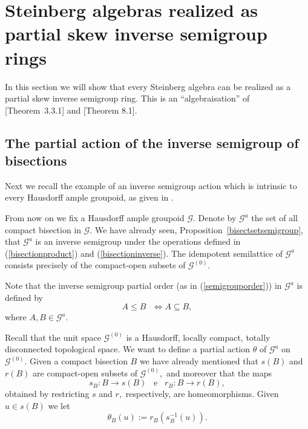 \documentclass[11pt, a4paper]{amsart}
\newcommand{\G}{\ensuremath {\mathcal{G}}}
\newcommand{\Go}{\ensuremath {\mathcal{G}^{(0)}}}
\newcommand{\Ga}{\ensuremath {\mathcal{G}^{a}}}
\theoremstyle{plain}
\begin{document}
\section{Steinberg algebras realized as partial skew inverse semigroup rings }


In this section we will show that every Steinberg algebra can be realized as a partial skew inverse semigroup ring. This is an “algebraisation” of [Theorem~3.3.1]\cite{Paterson} and [Theorem 8.1]\cite{Quigg}.


\subsection*{The partial action of the inverse semigroup of bisections}\label{PAISGBi}

Next we recall the example of an inverse semigroup action which is intrinsic to every Hausdorff ample groupoid, as given in \cite{Exel}. 

From now on we fix a Hausdorff ample groupoid $\G$. Denote by $\Ga$ the set of all compact bisection in $\G.$ We have already seen, Proposition~\ref{bisectsetsemigroup}, that $\Ga$ is an inverse semigroup under the operations defined in (\ref{bisectionproduct}) and (\ref{bisectioninverse}). The idempotent semilattice of $\Ga$ consists precisely of the compact-open subsets of $\Go.$

Note that the inverse semigroup partial order (as in (\ref{semigrouporder})) in $\Ga$ is defined by
$$A \leq B \,\,\,\, \Leftrightarrow A \subseteq B, $$
where $A, B \in \Ga.$

Recall that the unit space $\Go$ is a Hausdorff, locally compact, totally disconnected topological space.  We want to define a partial action $\theta$ of $\Ga$ on $\Go.$ Given a compact bisection $B$ we have already mentioned that $s(B)$ and $r(B)$ are compact-open subsets of $\Go,$ and moreover that the maps
  $$ s_B : B \to s(B) \,\,\,\,\,   \mbox{e} \,\,\,\,\,   r_B : B \to r(B), $$
obtained by restricting $s$ and $r,$ respectively, are homeomorphisms. Given $u \in s(B)$ we let
\begin{equation}\label{acaosemigrupobissecao}
      \theta_B(u) := r_B(s_B^{-1}(u)). 
\end{equation}  
\end{document}
